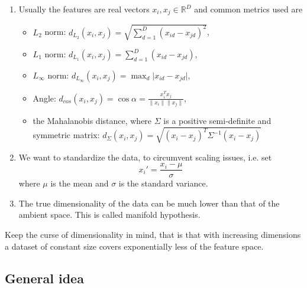 \begin{rmk}

\begin{enumerate} 
    \item 
    Usually the features are real vectors $ x_i , x_j \in \mathbb{ R }^D $
    and common metrics used are
    \begin{itemize}
        \item 
        $ L_2 $ norm: $d_{ L_2 } ( x_i , x_j ) = \sqrt{ \sum_{ d = 1 }^D ( x_{ id } - x_{ jd } )^2 }$,

        \item 
        $ L_1 $ norm: $d_{ L_1 } ( x_i , x_j ) = \sum_{ d = 1 }^D ( x_{ id } - x_{ jd } )$,

        \item 
        $ L_\infty $ norm: $d_{ L_\infty } ( x_i , x_j ) = \max_d \lvert x_{ id } - x_{ jd } \rvert$,

        \item 
        Angle: $ d_{ cos } ( x_i , x_j ) = \cos \alpha = \frac{ x_i^T x_j }{ \lVert x_i \rVert \lVert x_j \rVert }$,

        \item 
        the Mahalanobis distance, where $ \Sigma $ is a positive semi-definite and symmetric matrix:
        $ d_\Sigma ( x_i , x_j ) = \sqrt{ ( x_i - x_j )^T \Sigma^{ - 1 } ( x_i - x_j ) } $
    \end{itemize}

    \item 
    We want to standardize the data, to circumvent scaling issues, i.e. set
    \[
        x_i' 
        =
        \frac{ x_i - \mu }{ \sigma }
    \]
    where $ \mu $ is the mean and $ \sigma $ is the standard variance.

    \item 
    The true dimensionality of the data can be much lower than that of the ambient space. 
    This is called manifold hypothesis.
\end{enumerate}
\end{rmk}

\begin{Warning}
    Keep the curse of dimensionality in mind, that is that with increasing dimensions a dataset of constant size covers exponentially less of the feature space.
\end{Warning}

\subsection{General idea}

